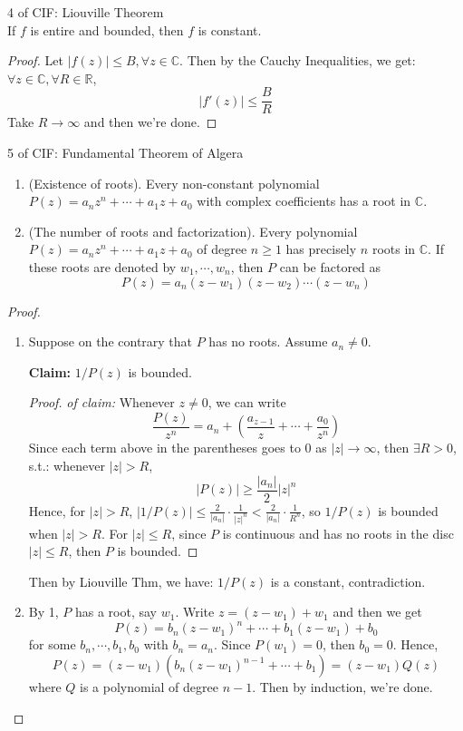 \begin{corollary}{4 of CIF: Liouville Theorem}\\
If $f$ is entire and bounded, then $f$ is constant.
\end{corollary}

\begin{proof}
    Let $|f(z)| \leq B, \forall z\in \mathbb{C}$. Then by the Cauchy Inequalities, we get: $\forall z\in \mathbb{C}, \forall R\in \mathbb{R}$,
    \[
    |f'(z)| \leq \frac{B}{R}
    \]
    Take $R\to \infty$ and then we're done.
\end{proof}

\begin{corollary}{5 of CIF: Fundamental Theorem of Algera}
\begin{enumerate}
    \item (Existence of roots). Every non-constant polynomial $P(z)= a_n z^n+\cdots +a_1z +a_0$ with complex coefficients has a root in $\mathbb{C}$.
    \item (The number of roots and factorization). Every polynomial $P(z)= a_nz^n +\cdots+ a_1z+a_0$ of degree $n\geq 1$ has precisely $n$ roots in $\mathbb{C}$. If these roots are denoted by $w_1 ,\cdots, w_n$, then $P$ can be factored as
    \[
    P(z)= a_n(z-w_1) (z-w_2) \cdots (z-w_n)
    \]
\end{enumerate}
\end{corollary}

\begin{proof}
    \begin{enumerate}
        \item Suppose on the contrary that $P$ has no roots. Assume $a_n \neq 0$.
        
        \noindent\textbf{Claim:} $1/P(z)$ is bounded.
        \begin{proof}
            \textit{of claim:} Whenever $z\neq 0$, we can write
            \[
            \frac{P(z)}{z^n}= a_n+(\frac{a_{z-1}}{z} +\cdots +\frac{a_0}{z^n})
            \]
            Since each term above in the parentheses goes to $0$ as $|z|\to \infty$, then $\exists R>0$, s.t.: whenever $|z|>R$,
            \[
            |P(z)|\geq \frac{|a_n|}{2} |z|^n
            \]
            Hence, for $|z|>R$, $|1/P(z)| \leq \frac{2}{|a_n|}\cdot \frac{1}{|z|^n} <\frac{2}{|a_n|} \cdot \frac{1}{R^n}$, so $1/P(z)$ is bounded when $|z|>R$. For $|z|\leq R$, since $P$ is continuous and has no roots in the disc $|z|\leq R$, then $P$ is bounded.
        \end{proof}
        Then by Liouville Thm, we have: $1/P(z)$ is a constant, contradiction.

        \item By 1, $P$ has a root, say $w_1$. Write $z=(z-w_1) +w_1$ and then we get
        \[
        P(z)=b_n (z-w_1)^n+ \cdots+ b_1(z-w_1) +b_0
        \]
        for some $b_n ,\cdots, b_1,b_0$ with $b_n=a_n$. Since $P(w_1)=0$, then $b_0=0$. Hence,
        \[
        P(z)= (z-w_1)(b_n(z-w_1)^{n-1} +\cdots +b_1)= (z-w_1)Q(z)
        \]
        where $Q$ is a polynomial of degree $n-1$. Then by induction, we're done.
    \end{enumerate}
\end{proof}

